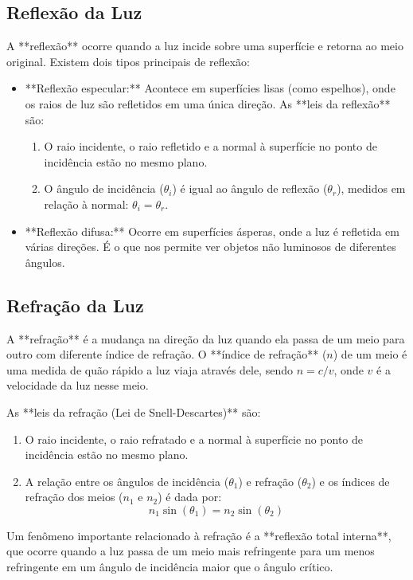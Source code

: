 \documentclass{article}
\begin{document}
\subsection{Reflexão da Luz}

A **reflexão** ocorre quando a luz incide sobre uma superfície e retorna ao meio original. Existem dois tipos principais de reflexão:
\begin{itemize}
    \item **Reflexão especular:** Acontece em superfícies lisas (como espelhos), onde os raios de luz são refletidos em uma única direção. As **leis da reflexão** são:
    \begin{enumerate}
        \item O raio incidente, o raio refletido e a normal à superfície no ponto de incidência estão no mesmo plano.
        \item O ângulo de incidência ($\theta_i$) é igual ao ângulo de reflexão ($\theta_r$), medidos em relação à normal: $\theta_i = \theta_r$.
    \end{enumerate}
    \item **Reflexão difusa:** Ocorre em superfícies ásperas, onde a luz é refletida em várias direções. É o que nos permite ver objetos não luminosos de diferentes ângulos.
\end{itemize}

\subsection{Refração da Luz}

A **refração** é a mudança na direção da luz quando ela passa de um meio para outro com diferente índice de refração. O **índice de refração** ($n$) de um meio é uma medida de quão rápido a luz viaja através dele, sendo $n = c/v$, onde $v$ é a velocidade da luz nesse meio.

As **leis da refração (Lei de Snell-Descartes)** são:
\begin{enumerate}
    \item O raio incidente, o raio refratado e a normal à superfície no ponto de incidência estão no mesmo plano.
    \item A relação entre os ângulos de incidência ($\theta_1$) e refração ($\theta_2$) e os índices de refração dos meios ($n_1$ e $n_2$) é dada por:
    $$n_1 \sin(\theta_1) = n_2 \sin(\theta_2)$$
\end{enumerate}
Um fenômeno importante relacionado à refração é a **reflexão total interna**, que ocorre quando a luz passa de um meio mais refringente para um menos refringente em um ângulo de incidência maior que o ângulo crítico.
\end{document}
